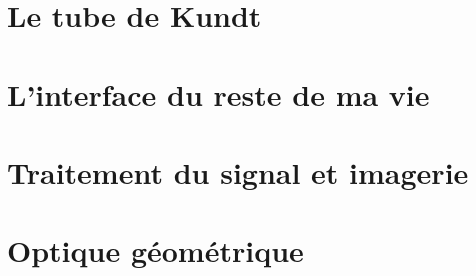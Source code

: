 \documentclass[a4paper,11pt]{article}
\begin{document}
\newpage

\section{Le tube de Kundt}

\section{L'interface du reste de ma vie}

\section{Traitement du signal et imagerie}
\section{Optique géométrique}
\end{document}
